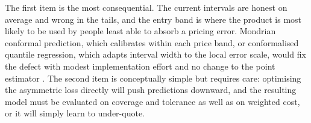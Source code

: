 The first item is the most consequential. The current intervals are honest on average
and wrong in the tails, and the entry band is where the product is most likely to be
used by people least able to absorb a pricing error. Mondrian conformal prediction,
which calibrates within each price band, or conformalised quantile regression, which
adapts interval width to the local error scale, would fix the defect with modest
implementation effort and no change to the point estimator
\citep{romano2019cqr,angelopoulos2023conformal}. The second item is conceptually simple
but requires care: optimising the asymmetric loss directly will push predictions
downward, and the resulting model must be evaluated on coverage and tolerance as well
as on weighted cost, or it will simply learn to under-quote.
